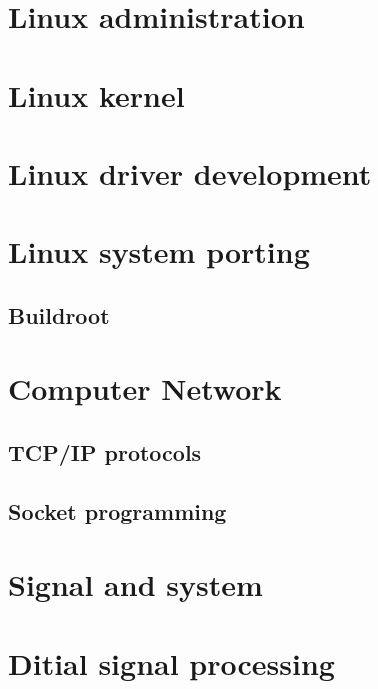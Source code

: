 \documentclass[UTF8]{book}
\begin{document}
	\part{Linux administration}
	
	\part{Linux kernel}
	
	\part{Linux driver development}
	
	\part{Linux system porting}
	\chapter{Buildroot}
	
	\part{Computer Network}
	\chapter{TCP/IP protocols}
	\chapter{Socket programming}
	
	
	\part{Signal and system}
	
	\part{Ditial signal processing}
	\begin{comment} 
	rather stupid, but helpful 
	\chapter{FFT}
	\chapter{FIR}
	\chapter{IIR}
	\end{comment}
\end{document}
